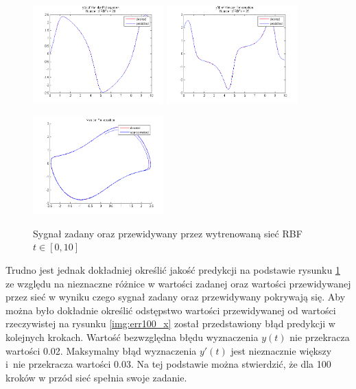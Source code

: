 \begin{figure}[ht!]
	\centering

	\subfloat
	{\includegraphics[width=0.45\textwidth]
	{images/signal_pred100.png}}
	\subfloat
	{\includegraphics[width=0.45\textwidth]
	{images/deriv_pred100.png}}	
	
	\subfloat
	{\includegraphics[width=0.45\textwidth]
	{images/trajectory_pred100.png}}

	\caption{Sygnał zadany oraz przewidywany przez wytrenowaną sieć RBF $t \in [0,10]$}
	\label{img:predicted}
\end{figure}

Trudno jest jednak dokładniej określić jakość predykcji na podstawie rysunku \ref{img:predicted} ze względu na nieznaczne różnice w wartości zadanej oraz wartości przewidywanej przez sieć w wyniku czego sygnał zadany oraz przewidywany pokrywają się. Aby można było dokładnie określić odstępstwo wartości przewidywanej od wartości rzeczywistej na rysunku \ref{img:err100_x} został przedstawiony błąd predykcji w kolejnych krokach. Wartość bezwzględna błędu wyznaczenia $y(t)$ nie przekracza wartości 0.02. Maksymalny błąd wyznaczenia $y'(t)$ jest nieznacznie większy i~nie przekracza wartości 0.03. Na tej podstawie można stwierdzić, że dla 100 kroków w przód sieć spełnia swoje zadanie. 


